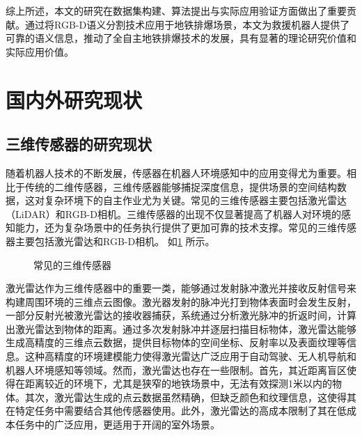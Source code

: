 综上所述，本文的研究在数据集构建、算法提出与实际应用验证方面做出了重要贡献。通过将RGB-D语义分割技术应用于地铁排爆场景，本文为救援机器人提供了可靠的语义信息，推动了全自主地铁排爆技术的发展，具有显著的理论研究价值和实际应用价值。


\section{国内外研究现状}

\subsection{三维传感器的研究现状}
随着机器人技术的不断发展，传感器在机器人环境感知中的应用变得尤为重要。相比于传统的二维传感器，三维传感器能够捕捉深度信息，提供场景的空间结构数据，这对复杂环境下的自主作业尤为关键。常见的三维传感器主要包括激光雷达（LiDAR）和RGB-D相机。三维传感器的出现不仅显著提高了机器人对环境的感知能力，还为复杂场景中的任务执行提供了更加可靠的技术支撑。常见的三维传感器主要包括激光雷达和RGB-D相机。
如\ref{图：常见的三维传感器} 所示。
\begin{figure}[h]
	\centering%
	\vspace{-1em}
	\caption{常见的三维传感器}
	\label{图：常见的三维传感器}
\end{figure}

激光雷达作为三维传感器中的重要一类，能够通过发射脉冲激光并接收反射信号来构建周围环境的三维点云图像。激光器发射的脉冲光打到物体表面时会发生反射，一部分反射光被激光雷达的接收器捕获，系统通过分析激光脉冲的折返时间，计算出激光雷达到物体的距离。通过多次发射脉冲并逐层扫描目标物体，激光雷达能够生成高精度的三维点云数据，提供目标物体的空间坐标、反射率以及表面纹理等信息。这种高精度的环境建模能力使得激光雷达广泛应用于自动驾驶、无人机导航和机器人环境感知等领域。然而，激光雷达也存在一些限制。首先，其近距离盲区使得在距离较近的环境下，尤其是狭窄的地铁场景中，无法有效探测1米以内的物体。其次，激光雷达生成的点云数据虽然精确，但缺乏颜色和纹理信息，这使得其在特定任务中需要结合其他传感器使用。此外，激光雷达的高成本限制了其在低成本任务中的广泛应用，更适用于开阔的室外场景。

